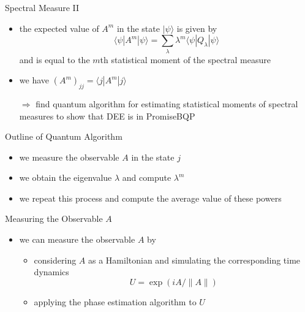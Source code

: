 \documentclass[slideColor]{prosper}
\renewcommand{\>}{\rangle}
\newcommand{\<}{\langle}
\begin{document}
\begin{slide}{Spectral Measure II}
\begin{itemize}
\item the expected value of $A^m$ in the state $|\psi\>$ is given by
\[
\<\psi|A^m|\psi\> = \sum_\lambda \lambda^m \<\psi |Q_\lambda|\psi\>
\]
and is equal to the $m$th statistical moment of the spectral measure

\medskip
\item we have $(A^m)_{jj} = \<j|A^m|j\>$

\bigskip
$\Rightarrow$ find quantum algorithm for estimating statistical moments of spectral measures to show that DEE is in PromiseBQP
\end{itemize}
\end{slide}


\begin{slide}{Outline of Quantum Algorithm}
\begin{itemize}
\item we measure the observable $A$ in the state $j$

\medskip
\item we obtain the eigenvalue $\lambda$ and compute $\lambda^m$ 

\medskip
\item we repeat this process and compute the average value of these powers
\end{itemize}
\end{slide}


\begin{slide}{Measuring the Observable $A$}

\begin{itemize}
\item we can measure the observable $A$ by

\medskip
\begin{itemize}
\item considering $A$ as a Hamiltonian and simulating the corresponding time dynamics
\[
U = \exp(i A / \|A\|)
\]

\medskip
\item applying the phase estimation algorithm to $U$
\end{itemize}
\end{itemize}

\end{slide}
\end{document}
